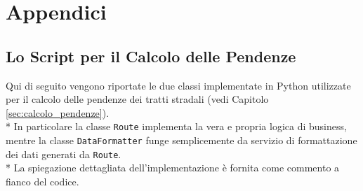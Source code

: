 \appendix
\chapter*{Appendici}
\renewcommand{\thesection}{\Alph{section}}
	\captionsetup{aboveskip=1pt, belowskip=30pt} %

	\section{Lo Script per il Calcolo delle Pendenze}\label{appendix:model}
		Qui di seguito vengono riportate le due classi implementate in Python utilizzate per il calcolo delle pendenze dei tratti stradali (vedi Capitolo \ref{sec:calcolo_pendenze}). \\*
		In particolare la classe \texttt{Route} implementa la vera e propria logica di business, mentre la classe \texttt{DataFormatter} funge semplicemente da servizio di formattazione dei dati generati da \texttt{Route}.\\*
		La spiegazione dettagliata dell'implementazione è fornita come commento a fianco del codice.


		\inputminted[autogobble, frame=lines, framesep=3mm]{python}{code/process_routes.py}

